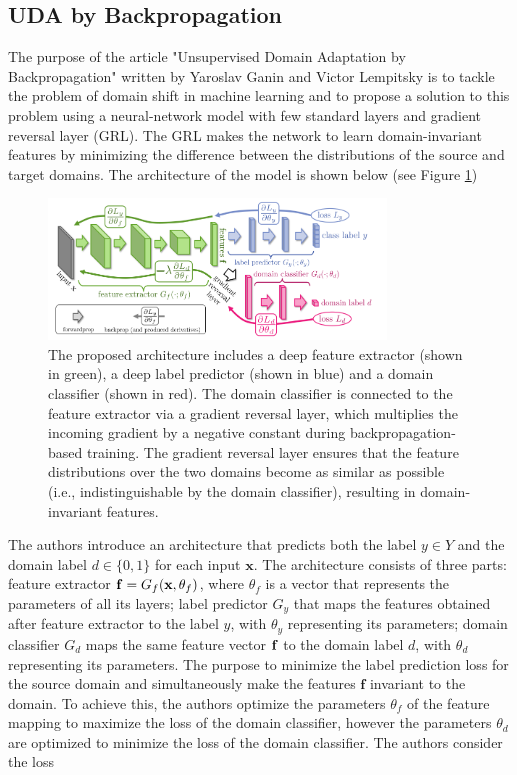 \subsection{UDA by Backpropagation}

The purpose of the article "Unsupervised Domain Adaptation by Backpropagation" written by Yaroslav Ganin and Victor Lempitsky \cite{ganin2015unsupervised} is to tackle the problem of domain shift in machine learning and to propose a solution to this problem using a neural-network model with few standard layers and gradient reversal layer (GRL). The GRL makes the network to learn domain-invariant features by minimizing the difference between the distributions of the source and target domains. The architecture of the model is shown below (see Figure \ref{fig: uda_back})

\begin{figure}[H]
    \centering
    \includegraphics[width=0.8\textwidth]{Figures/From articles/uda_backpropagation.png}
    \caption{The proposed architecture includes a deep feature extractor (shown in green), a deep label predictor (shown in blue) and a domain classifier (shown in red). The domain classifier is connected to the feature extractor via a gradient reversal layer, which multiplies the incoming gradient by a negative constant during backpropagation-based training. The gradient reversal layer ensures that the feature distributions over the two domains become as similar as possible (i.e., indistinguishable by the domain classifier), resulting in domain-invariant features.}
    \label{fig: uda_back}
\end{figure}

The authors introduce an architecture that predicts both the label $y \in Y$ and the domain label $d \in \{0, 1\}$ for each input $\textbf{x}$. The architecture consists of three parts: feature extractor $\bold{f} = G_f(\textbf{x}, \theta_f)$, where $\theta_f$ is a vector that represents the parameters of all its layers; label predictor $G_y$ that maps the features obtained after feature extractor to the label $y$, with $\theta_y$ representing its parameters; domain classifier $G_d$ maps the same feature vector $\bold{f}$ to the domain label $d$, with $\theta_d$ representing its parameters. The purpose to minimize the label prediction loss for the source domain and simultaneously make the features $\textbf{f}$ invariant to the domain. To achieve this, the authors optimize the parameters $\theta_f$ of the feature mapping to maximize the loss of the domain classifier, however the parameters $\theta_d$ are optimized to minimize the loss of the domain classifier. The authors consider the loss

